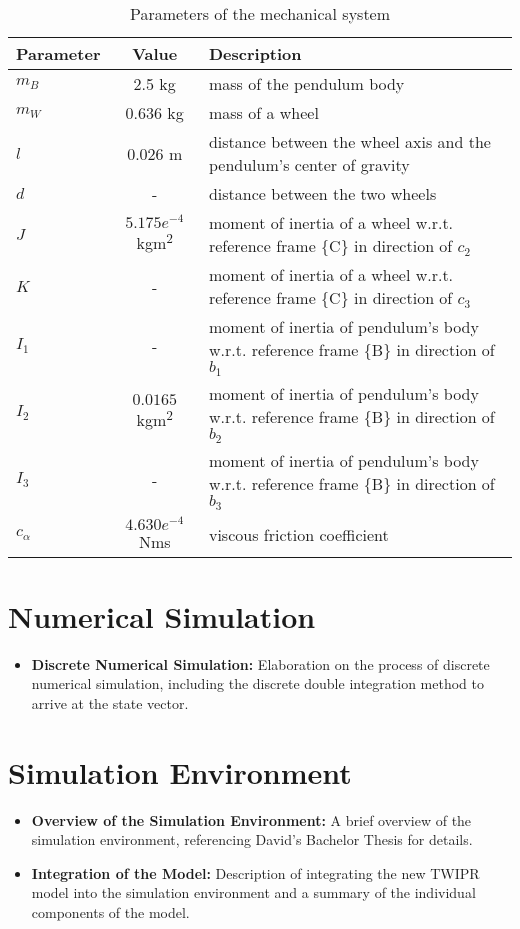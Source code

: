 \begin{itemize}
	
	\begin{table}[h!]
		\centering
		\caption{Parameters of the mechanical system}
		\label{tab:parameters}
		\begin{tabular}{lcl}
			\toprule
			Parameter & Value & Description \\
			\midrule
			$m_B$ & 2.5 kg & mass of the pendulum body \\
			$m_W$ & 0.636 kg & mass of a wheel \\
			$l$ & 0.026 m & distance between the wheel axis and the pendulum's center of gravity \\
			$d$ & - & distance between the two wheels \\
			$J$ & \(5.175 e^{-4}\) kgm\textsuperscript{2} & moment of inertia of a wheel w.r.t. reference frame \{C\} in direction of \(c_2\) \\
			$K$ & - & moment of inertia of a wheel w.r.t. reference frame \{C\} in direction of \(c_3\) \\
			$I_1$ & - & moment of inertia of pendulum's body w.r.t. reference frame \{B\} in direction of \(b_1\) \\
			$I_2$ & \(0.0165\) kgm\textsuperscript{2} & moment of inertia of pendulum's body w.r.t. reference frame \{B\} in direction of \(b_2\) \\
			$I_3$ & - & moment of inertia of pendulum's body w.r.t. reference frame \{B\} in direction of \(b_3\) \\
			$c_\alpha$ & \(4.630 e^{-4}\) Nms & viscous friction coefficient \\
			\bottomrule
		\end{tabular}
	\end{table}
\end{itemize}

\section{Numerical Simulation}
\begin{itemize}
	\item \textbf{Discrete Numerical Simulation:} Elaboration on the process of discrete numerical simulation, including the discrete double integration method to arrive at the state vector.
\end{itemize}

\section{Simulation Environment}
\begin{itemize}
	\item \textbf{Overview of the Simulation Environment:} A brief overview of the simulation environment, referencing David's Bachelor Thesis for details.
	
	
	\item \textbf{Integration of the Model:} Description of integrating the new TWIPR model into the simulation environment and a summary of the individual components of the model.
\end{itemize}

